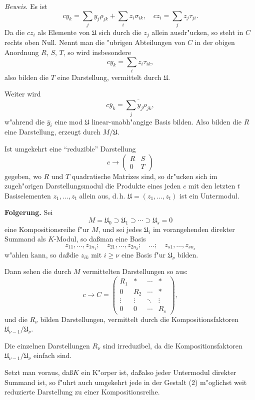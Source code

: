 \documentclass[12pt,a4paper]{article}
\theoremstyle{plain}
\begin{document}
\noindent\textit{Beweis.}
Es ist
\[
cy_k = \sum_j y_j\rho_{jk} + \sum_i z_i\sigma_{ik},\quad
cz_i = \sum_j z_j\tau_{ji}.
\]
Da die $cz_i$ als Elemente von $\mathfrak{U}$ sich durch die $z_j$ allein ausdr"ucken, so steht in $C$ rechts oben Null. Nennt man die "ubrigen Abteilungen von $C$ in der obigen Anordnung $R$, $S$, $T$, so wird insbesondere
\[
cy_k = \sum_i z_i\tau_{ik},
\]
also bilden die $T$ eine Darstellung, vermittelt durch $\mathfrak{U}$.

Weiter wird
\[
c\bar{y}_k = \overline{\sum_j y_j\rho_{jk}},
\]
w"ahrend die $\bar{y}_i$ eine mod $\mathfrak{U}$ linear-unabh"angige Basis bilden. Also bilden die $R$ eine Darstellung, erzeugt durch $M/\mathfrak{U}$.

Ist umgekehrt eine ``reduzible'' Darstellung
\[
c \to \begin{pmatrix} R & S \\ 0 & T \end{pmatrix}
\]
gegeben, wo $R$ und $T$ quadratische Matrizes sind, so dr"ucken sich im zugeh"origen Darstellungsmodul die Produkte eines jeden $c$ mit den letzten $t$ Basiselementen $z_1,\ldots,z_t$ allein aus, d.\,h. $\mathfrak{U} = (z_1,\ldots,z_t)$ ist ein Untermodul.

\medskip\noindent\textbf{Folgerung.}
Sei
\[
M = \mathfrak{U}_0 \supset \mathfrak{U}_1 \supset \cdots \supset \mathfrak{U}_s = 0
\]
eine Kompositionsreihe f"ur $M$, und sei jedes $\mathfrak{U}_i$ im vorangehenden direkter Summand als $K$-Modul, so da\ss man eine Basis
\[
z_{11},\ldots,z_{1n_1};\quad z_{21},\ldots,z_{2n_2};\quad\ldots;\quad z_{s1},\ldots,z_{sn_s}
\]
w"ahlen kann, so da\ss die $z_{ik}$ mit $i \geq \nu$ eine Basis f"ur $\mathfrak{U}_\nu$ bilden.

Dann sehen die durch $M$ vermittelten Darstellungen so aus:
\[
c \to C = \begin{pmatrix}
R_1 & * & \cdots & * \\
0 & R_2 & \cdots & * \\
\vdots & \vdots & \ddots & \vdots \\
0 & 0 & \cdots & R_s
\end{pmatrix},
\]
und die $R_\nu$ bilden Darstellungen, vermittelt durch die Kompositionsfaktoren $\mathfrak{U}_{\nu-1}/\mathfrak{U}_\nu$.

Die einzelnen Darstellungen $R_\nu$ sind irreduzibel, da die Kompositionsfaktoren $\mathfrak{U}_{\nu-1}/\mathfrak{U}_\nu$ einfach sind.

Setzt man voraus, da\ss $K$ ein K"orper ist, da\ss also jeder Untermodul direkter Summand ist, so f"uhrt auch umgekehrt jede in der Gestalt (2) m"oglichst weit reduzierte Darstellung zu einer Kompositionsreihe.
\end{document}
